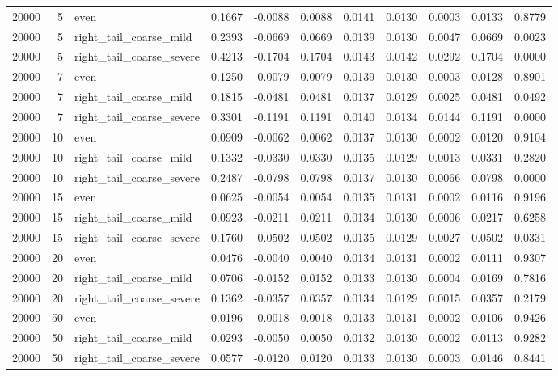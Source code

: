 \begin{table}[!h]
{\begin{tabular}[t]{rrlrrrrrrrr}
20000 & 5 & even & 0.1667 & -0.0088 & 0.0088 & 0.0141 & 0.0130 & 0.0003 & 0.0133 & 0.8779\\
20000 & 5 & right\_tail\_coarse\_mild & 0.2393 & -0.0669 & 0.0669 & 0.0139 & 0.0130 & 0.0047 & 0.0669 & 0.0023\\
20000 & 5 & right\_tail\_coarse\_severe & 0.4213 & -0.1704 & 0.1704 & 0.0143 & 0.0142 & 0.0292 & 0.1704 & 0.0000\\
20000 & 7 & even & 0.1250 & -0.0079 & 0.0079 & 0.0139 & 0.0130 & 0.0003 & 0.0128 & 0.8901\\
20000 & 7 & right\_tail\_coarse\_mild & 0.1815 & -0.0481 & 0.0481 & 0.0137 & 0.0129 & 0.0025 & 0.0481 & 0.0492\\
20000 & 7 & right\_tail\_coarse\_severe & 0.3301 & -0.1191 & 0.1191 & 0.0140 & 0.0134 & 0.0144 & 0.1191 & 0.0000\\
20000 & 10 & even & 0.0909 & -0.0062 & 0.0062 & 0.0137 & 0.0130 & 0.0002 & 0.0120 & 0.9104\\
20000 & 10 & right\_tail\_coarse\_mild & 0.1332 & -0.0330 & 0.0330 & 0.0135 & 0.0129 & 0.0013 & 0.0331 & 0.2820\\
20000 & 10 & right\_tail\_coarse\_severe & 0.2487 & -0.0798 & 0.0798 & 0.0137 & 0.0130 & 0.0066 & 0.0798 & 0.0000\\
20000 & 15 & even & 0.0625 & -0.0054 & 0.0054 & 0.0135 & 0.0131 & 0.0002 & 0.0116 & 0.9196\\
20000 & 15 & right\_tail\_coarse\_mild & 0.0923 & -0.0211 & 0.0211 & 0.0134 & 0.0130 & 0.0006 & 0.0217 & 0.6258\\
20000 & 15 & right\_tail\_coarse\_severe & 0.1760 & -0.0502 & 0.0502 & 0.0135 & 0.0129 & 0.0027 & 0.0502 & 0.0331\\
20000 & 20 & even & 0.0476 & -0.0040 & 0.0040 & 0.0134 & 0.0131 & 0.0002 & 0.0111 & 0.9307\\
20000 & 20 & right\_tail\_coarse\_mild & 0.0706 & -0.0152 & 0.0152 & 0.0133 & 0.0130 & 0.0004 & 0.0169 & 0.7816\\
20000 & 20 & right\_tail\_coarse\_severe & 0.1362 & -0.0357 & 0.0357 & 0.0134 & 0.0129 & 0.0015 & 0.0357 & 0.2179\\
20000 & 50 & even & 0.0196 & -0.0018 & 0.0018 & 0.0133 & 0.0131 & 0.0002 & 0.0106 & 0.9426\\
20000 & 50 & right\_tail\_coarse\_mild & 0.0293 & -0.0050 & 0.0050 & 0.0132 & 0.0130 & 0.0002 & 0.0113 & 0.9282\\
20000 & 50 & right\_tail\_coarse\_severe & 0.0577 & -0.0120 & 0.0120 & 0.0133 & 0.0130 & 0.0003 & 0.0146 & 0.8441\\
\bottomrule
\end{tabular}}
\end{table}